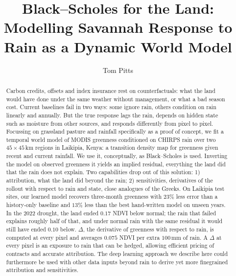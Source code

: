 \documentclass[letterpaper]{article} %
\title{Black--Scholes for the Land:\\ Modelling Savannah Response to Rain as a Dynamic World Model}
\author{
    Tom Pitts
}
\begin{document}
\maketitle

\begin{abstract}
Carbon credits, offsets and index insurance rest on counterfactuals: what the land would have done under the same weather without management, or what a bad season cost. Current baselines fail in two ways: some ignore rain, others condition on rain linearly and annually. But the true response lags the rain, depends on hidden state such as moisture from other sources, and responds differently from pixel to pixel. Focussing on grassland pasture and rainfall specifically as a proof of concept, we fit a temporal world model of MODIS greenness conditioned on CHIRPS rain over two $45\times45$\,km regions in Laikipia, Kenya: a transition density map for greenness given recent and current rainfall. We use it, conceptually, as Black--Scholes is used. Inverting the model on observed greenness it yields an implied residual, everything the land did that the rain does not explain. Two capabilities drop out of this solution: 1) attribution, what the land did beyond the rain; 2) sensitivities, derivatives of the rollout with respect to rain and state, close analogues of the Greeks. On Laikipia test sites, our learned model recovers three-month greenness with $23\%$ less error than a history-only baseline and $13\%$ less than the best hand-written model on unseen years. In the 2022 drought, the land ended $0.17$ NDVI below normal; the rain that failed explains roughly half of that, and under normal rain with the same residual it would still have ended $0.10$ below. $\Delta$, the derivative of greenness with respect to rain, is computed at every pixel and averages $0.075$ NDVI per extra $100$\,mm of rain. A $\Delta$ at every pixel is an exposure to rain that can be hedged, allowing efficient pricing of contracts and accurate attribution. The deep learning approach we describe here could furthermore be used with other data inputs beyond rain to derive yet more finegrained attribution and sensitivities.
\end{abstract}
\end{document}
